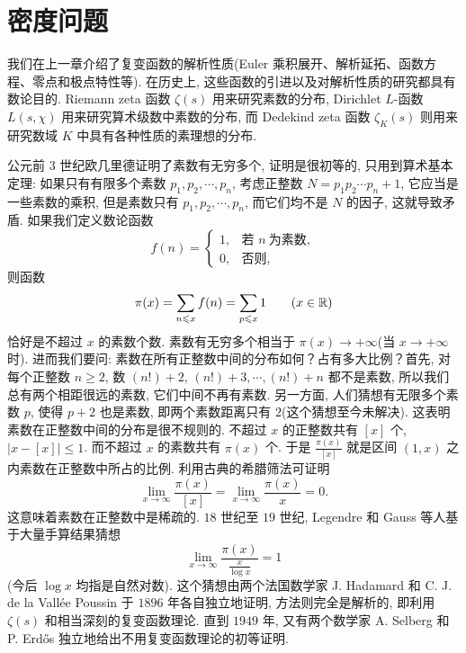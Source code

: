 \chapter{密度问题}\label{ch:5}

我们在上一章介绍了复变函数的解析性质(Euler 乘积展开、解析延拓、函数方程、零点和极点特性等). 在历史上, 这些函数的引进以及对解析性质的研究都具有数论目的. Riemann zeta 函数 $\zeta(s)$ 用来研究素数的分布, Dirichlet $L$-函数 $L(s,\chi)$ 用来研究算术级数中素数的分布, 而 Dedekind zeta 函数 $\zeta_K(s)$ 则用来研究数域 $K$ 中具有各种性质的素理想的分布. 

\begin{sloppypar}
公元前 $3$ 世纪欧几里德证明了素数有无穷多个, 证明是很初等的, 只用到算术基本定理: 如果只有有限多个素数 $p_1,p_2,\cdots,p_n$, 考虑正整数 $N=p_1p_2\cdots p_n+1$, 它应当是一些素数的乘积, 但是素数只有 $p_1,p_2,\cdots,p_n$, 而它们均不是 $N$ 的因子, 这就导致矛盾. 如果我们定义数论函数
\[
  f(n)=\begin{cases}
    1, & \text{若 } n\ \text{为素数},\\
    0, & \text{否则},
  \end{cases}
\]
则函数
\[
  \pi(x)=\sum_{n\leqslant x}f(n)=\sum_{p\leqslant x}1\qquad(x\in\mathbb{R})
\]
恰好是不超过 $x$ 的素数个数. 素数有无穷多个相当于 $\pi(x)\to+\infty$(当 $x\to+\infty$ 时). 进而我们要问: 素数在所有正整数中间的分布如何？占有多大比例？首先, 对每个正整数 $n\geqslant 2$, 数 $(n!)+2$, $(n!)+3,\cdots,(n!)+n$ 都不是素数, 所以我们总有两个相距很远的素数, 它们中间不再有素数. 另一方面, 人们猜想有无限多个素数 $p$, 使得 $p+2$ 也是素数, 即两个素数距离只有 $2$(这个猜想至今未解决). 这表明素数在正整数中间的分布是很不规则的. 不超过 $x$ 的正整数共有 $[x]$ 个, $|x-[x]|\leqslant 1$. 而不超过 $x$ 的素数共有 $\pi(x)$ 个. 于是 $\frac{\pi(x)}{[x]}$ 就是区间 $(1,x)$ 之内素数在正整数中所占的比例. 利用古典的希腊筛法可证明
\[
  \lim_{x\to\infty}\frac{\pi(x)}{[x]}=\lim_{x\to\infty}\frac{\pi(x)}{x}=0.
\]
这意味着素数在正整数中是稀疏的. $18$ 世纪至 $19$ 世纪, Legendre 和 Gauss 等人基于大量手算结果猜想
\begin{equation}  \lim_{x\to\infty}\frac{\pi(x)}{\frac{x}{\log x}}=1\tag{1}\end{equation}
(今后 $\log x$ 均指是自然对数). 这个猜想由两个法国数学家 J. Hadamard 和 C. J. de la Vallée Poussin 于 $1896$ 年各自独立地证明, 方法则完全是解析的, 即利用 $\zeta(s)$ 和相当深刻的复变函数理论. 直到 $1949$ 年, 又有两个数学家 A. Selberg 和 P. Erd\H{o}s 独立地给出不用复变函数理论的初等证明. 
\end{sloppypar}

